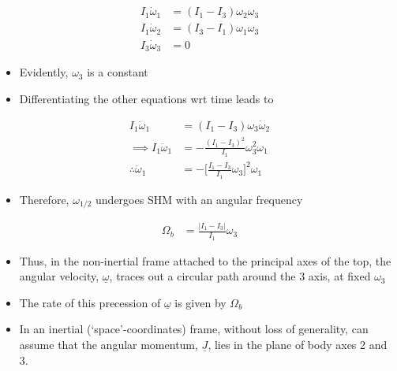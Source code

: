 \documentclass[a4paper,11pt,normalem]{article}
\begin{document}
\[
    \begin{aligned}
    I_1 \dot{\omega}_1 &= (I_1 - I_3)\omega_2\omega_3 \\
    I_1\dot{\omega}_2 &= (I_3 - I_1)\omega_1\omega_3 \\
    I_3\dot{\omega}_3 &= 0
    \end{aligned}
\]

\begin{itemize}
\item
  Evidently, \(\omega_3\) is a constant
\item
  Differentiating the other equations wrt time leads to
\end{itemize}

\[
    \begin{aligned}
    I_1\ddot{\omega}_1 &= (I_1 - I_3)\omega_3\dot{\omega}_2 \\
    \implies I_1\ddot{\omega}_1 &= -\frac{(I_1 - I_3)^2}{I_1} \omega_3^2 \omega_1 \\
    \therefore \ddot{\omega}_1 &= -\Bigg[\frac{I_1 - I_3}{I_1}\omega_3 \Bigg]^2 \omega_1
    \end{aligned}
\]

\begin{itemize}
\item
  Therefore, \(\omega_{1/2}\) undergoes SHM with an angular frequency
\end{itemize}

\[
    \begin{aligned}
    \Omega_b &= \frac{|I_1 - I_3|}{I_1}\omega_3
    \end{aligned}
\]

\begin{itemize}
\item
  Thus, in the non-inertial frame attached to the principal axes of the
  top, the angular velocity, \(\underline{\omega}\), traces out a
  circular path around the 3 axis, at fixed \(\omega_3\)
\item
  The rate of this precession of \(\underline{\omega}\) is given by
  \(\Omega_b\)
\item
  In an inertial (`space'-coordinates) frame, without loss of
  generality, can assume that the angular momentum, \(\underline{J}\),
  lies in the plane of body axes 2 and 3.
\end{itemize}
\end{document}
